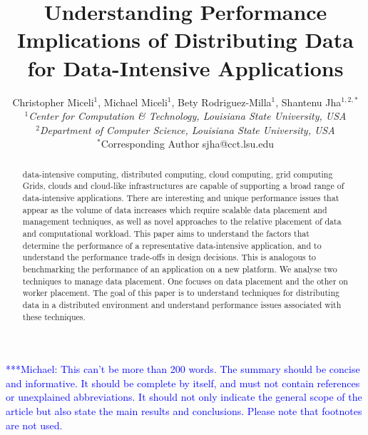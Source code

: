 \documentclass{rspublic}
\title[Understanding Performance Implications of Distributing Data for
Data-Intensive Applications]{Understanding Performance Implications of
Distributing Data for Data-Intensive Applications}
\author[Miceli, Miceli, Rodriguez-Milla, Jha]{ Christopher Miceli$^{1}$,
Michael Miceli$^{1}$, Bety Rodriguez-Milla$^{1}$, Shantenu Jha$^{1,2,*}$ \\
\small{\emph{$^{1}$Center for Computation \& Technology, Louisiana State
University, USA}} \\  \small{\emph{$^{2}$Department of Computer Science,
Louisiana State University, USA}} \\ {\footnotesize {\hspace{0.0 in}
$^*$Corresponding Author sjha@cct.lsu.edu}} }
\newcommand{\micnote}[1]{ {\textcolor{blue} { ***Michael: #1 }}}
\begin{document}
 \maketitle

\micnote{This can't be more than 200 words. The summary should be
concise and informative. It should be complete by itself, and must not
contain references or unexplained abbreviations. It should not only
indicate the general scope of the article but also state the main
results and conclusions. Please note that footnotes are not used.}

\begin{abstract}{data-intensive computing, distributed computing,
cloud computing, grid computing} 
Grids, clouds and cloud-like infrastructures are capable of supporting a
broad range of data-intensive applications. There are interesting and
unique performance issues that appear as the volume of data increases
which require scalable data placement and management techniques, as well
as novel approaches to the relative placement of data and computational
workload. This paper aims to understand the factors that determine the
performance of a representative data-intensive application, and to
understand the performance trade-offs in design decisions. This is
analogous to benchmarking the performance of an application on a new
platform. We analyse two techniques to manage data placement. One
focuses on data placement and the other on worker placement. The goal of
this paper is to understand techniques for distributing data in a
distributed environment and understand performance issues associated
with these techniques.

\end{abstract}

\end{document}
